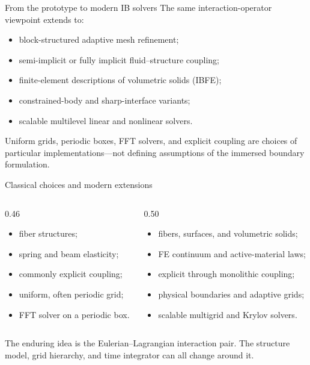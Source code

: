 \documentclass[aspectratio=169,11pt]{beamer}
\begin{document}
\begin{frame}{From the prototype to modern IB solvers}
The same interaction-operator viewpoint extends to:
\begin{itemize}\itemsep5pt
  \item block-structured adaptive mesh refinement;
  \item semi-implicit or fully implicit fluid--structure coupling;
  \item finite-element descriptions of volumetric solids (IBFE);
  \item constrained-body and sharp-interface variants;
  \item scalable multilevel linear and nonlinear solvers.
\end{itemize}
\begin{punchbox}
Uniform grids, periodic boxes, FFT solvers, and explicit coupling are choices of particular implementations---not defining assumptions of the immersed boundary formulation.
\end{punchbox}
\end{frame}

\begin{frame}{Classical choices and modern extensions}
\begin{columns}[T,onlytextwidth]
\begin{column}{0.46\textwidth}
\begin{punchbox}
\centering{}
\begin{itemize}\itemsep4pt
  \item fiber structures;
  \item spring and beam elasticity;
  \item commonly explicit coupling;
  \item uniform, often periodic grid;
  \item FFT solver on a periodic box.
\end{itemize}
\end{punchbox}
\end{column}
\begin{column}{0.50\textwidth}
\begin{punchbox}
\centering{}
\begin{itemize}\itemsep4pt
  \item fibers, surfaces, and volumetric solids;
  \item FE continuum and active-material laws;
  \item explicit through monolithic coupling;
  \item physical boundaries and adaptive grids;
  \item scalable multigrid and Krylov solvers.
\end{itemize}
\end{punchbox}
\end{column}
\end{columns}
\medskip
\begin{punchbox}
The enduring idea is the Eulerian--Lagrangian interaction pair. The structure model, grid hierarchy, and time integrator can all change around it.
\end{punchbox}
\end{frame}
\end{document}
